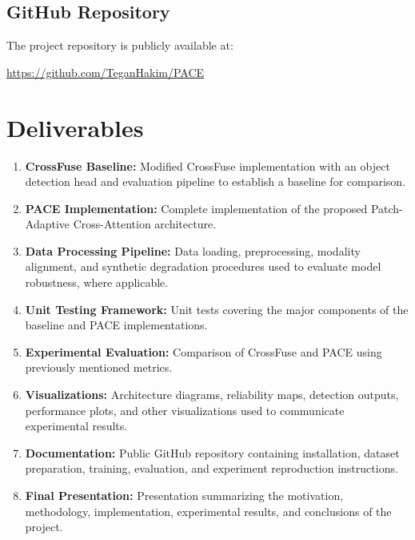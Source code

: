\documentclass[conference]{IEEEtran}
\begin{document}
\subsection{GitHub Repository}

The project repository is publicly available at:

\url{https://github.com/TeganHakim/PACE}


\section{Deliverables}

\begin{enumerate}
    \item \textbf{CrossFuse Baseline:} Modified CrossFuse implementation with an object detection head and evaluation pipeline to establish a baseline for comparison.
    
    \item \textbf{PACE Implementation:} Complete implementation of the proposed Patch-Adaptive Cross-Attention architecture.
    
    \item \textbf{Data Processing Pipeline:} Data loading, preprocessing, modality alignment, and synthetic degradation procedures used to evaluate model robustness, where applicable.
    
    \item \textbf{Unit Testing Framework:} Unit tests covering the major components of the baseline and PACE implementations.
    
    \item \textbf{Experimental Evaluation:} Comparison of CrossFuse and PACE using previously mentioned metrics.
    
    \item \textbf{Visualizations:} Architecture diagrams, reliability maps, detection outputs, performance plots, and other visualizations used to communicate experimental results.
    
    \item \textbf{Documentation:} Public GitHub repository containing installation, dataset preparation, training, evaluation, and experiment reproduction instructions.
    
    \item \textbf{Final Presentation:} Presentation summarizing the motivation, methodology, implementation, experimental results, and conclusions of the project.
\end{enumerate}
\end{document}
